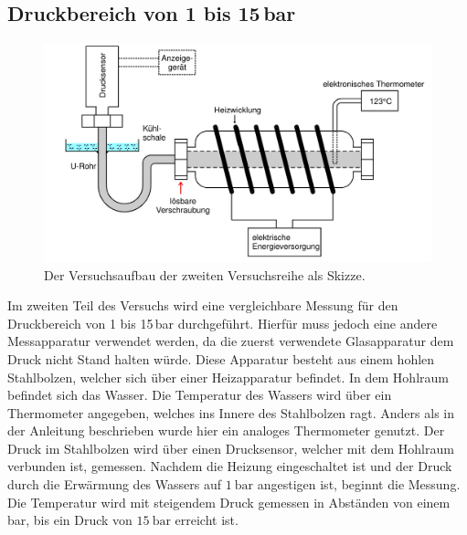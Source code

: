 \subsection{Druckbereich von 1 bis 15\,bar}
\begin{figure}[H]
    \centering
    \includegraphics[scale=0.5]{screen3.jpg}
    \caption{Der Versuchsaufbau der zweiten Versuchsreihe als Skizze.\cite{V203_Anleitung}}
\end{figure}
Im zweiten Teil des Versuchs wird eine vergleichbare Messung für den Druckbereich von 1 bis 15\,bar durchgeführt.
Hierfür muss jedoch eine andere Messapparatur verwendet werden, da die zuerst verwendete Glasapparatur dem Druck nicht Stand halten würde.
Diese Apparatur besteht aus einem hohlen Stahlbolzen, welcher sich über einer Heizapparatur befindet.
In dem Hohlraum befindet sich das Wasser.
Die Temperatur des Wassers wird über ein Thermometer angegeben, welches ins Innere des Stahlbolzen ragt.
Anders als in der Anleitung beschrieben wurde hier ein analoges Thermometer genutzt.
Der Druck im Stahlbolzen wird über einen Drucksensor, welcher mit dem Hohlraum verbunden ist, gemessen.
\noindent
Nachdem die Heizung eingeschaltet ist und der Druck durch die Erwärmung des Wassers auf $\SI{1}{\bar}$ angestigen ist, 
beginnt die Messung.
Die Temperatur wird mit steigendem Druck gemessen in Abständen von einem bar, bis ein Druck von $\SI{15}{\bar}$ erreicht ist.